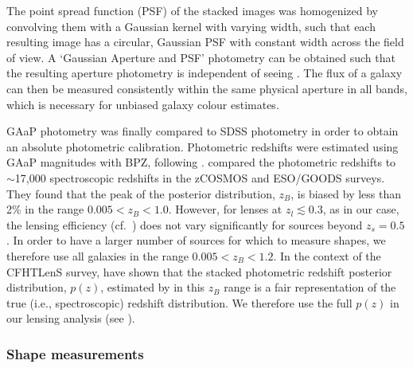 The point spread function (PSF) of the stacked images was homogenized by convolving them with a 
Gaussian kernel with varying width, such that each resulting image has a circular, Gaussian PSF 
with constant width across the field of view. A `Gaussian Aperture and PSF' 
\citep[GAaP,][]{kuijken08} photometry can be obtained such that the resulting aperture photometry 
is independent of seeing \citep[see Appendix A of][]{kuijken15}. The flux of a galaxy can then be 
measured consistently within the same physical aperture in all bands, which is necessary for 
unbiased galaxy colour estimates.

GAaP photometry was finally compared to SDSS photometry in order to obtain an absolute 
photometric calibration. Photometric redshifts were estimated using GAaP magnitudes with BPZ, 
following \cite{hildebrandt12}. \cite{kuijken15} compared the photometric redshifts to $\sim$17,000 
spectroscopic redshifts in the zCOSMOS \citep{lilly07} and ESO/GOODS \citep{vanzella08,balestra10} 
surveys. They found that the peak of the posterior distribution, $z_B$, is biased by less than 2\% 
in the range $0.005<z_B<1.0$. However, for lenses at $z_l\lesssim0.3$, as in our case, the lensing 
efficiency (cf.\ ) does not vary significantly for sources beyond $z_s=0.5$. In 
order to have a larger number of sources for which to measure shapes, we therefore use all galaxies 
in the range $0.005<z_B<1.2$. In the context of the CFHTLenS survey, \cite{benjamin13} have shown 
that the stacked photometric redshift posterior distribution, $p(z)$, estimated by 
\cite{hildebrandt12} in this $z_B$ range is a fair representation of the true (i.e., spectroscopic) 
redshift distribution. We therefore use the full $p(z)$ in our lensing analysis (see 
).


\subsubsection{Shape measurements}\label{s:shapes}

